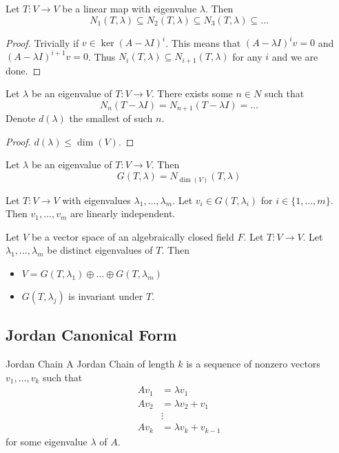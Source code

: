 \begin{prp}{}{} Let $T:V\to V$ be a linear map with eigenvalue $\lambda$. Then $$N_1(T,\lambda)\subseteq N_2(T,\lambda)\subseteq N_3(T,\lambda)\subseteq\dots$$ \tcbline
\begin{proof}
Trivially if $v\in\ker(A-\lambda I)^i$. This means that $(A-\lambda I)^iv=0$ and $(A-\lambda I)^{i+1}v=0$. Thus $N_i(T,\lambda)\subseteq N_{i+1}(T,\lambda)$ for any $i$ and we are done. 
\end{proof}
\end{prp}

\begin{prp}{}{} Let $\lambda$ be an eigenvalue of $T:V\to V$. There exists some $n\in N$ such that $$N_n(T-\lambda I)=N_{n+1}(T-\lambda I)=\dots$$ Denote $d(\lambda)$ the smallest of such $n$. \tcbline
\begin{proof}
$d(\lambda)\leq\dim(V)$. 
\end{proof}
\end{prp}

\begin{prp}{}{} Let $\lambda$ be an eigenvalue of $T:V\to V$. Then $$G(T,\lambda)=N_{\dim(V)}(T,\lambda)$$
\end{prp}

\begin{prp}{}{} Let $T:V\to V$ with eigenvalues $\lambda_1,\dots,\lambda_m$. Let $v_i\in G(T,\lambda_i)$ for $i\in\{1,\dots,m\}$. Then $v_1,\dots,v_m$ are linearly independent. 
\end{prp}

\begin{thm}{}{} Let $V$ be a vector space of an algebraically closed field $F$. Let $T:V\to V$. Let $\lambda_1,\dots,\lambda_m$ be distinct eigenvalues of $T$. Then
\begin{itemize}
\item $V=G(T,\lambda_1)\oplus\dots\oplus G(T,\lambda_m)$
\item $G(T,\lambda_j)$ is invariant under $T$. 
\end{itemize}
\end{thm}

\subsection{Jordan Canonical Form}
\begin{defn}{Jordan Chain}{} A Jordan Chain of length $k$ is a sequence of nonzero vectors $v_1,\dots,v_k$ such that
\begin{align*}
Av_1&=\lambda v_1\\
Av_2&=\lambda v_2+v_1\\
&\vdots\\
Av_k&=\lambda v_k+v_{k-1}
\end{align*}
for some eigenvalue $\lambda$ of $A$. 
\end{defn}

